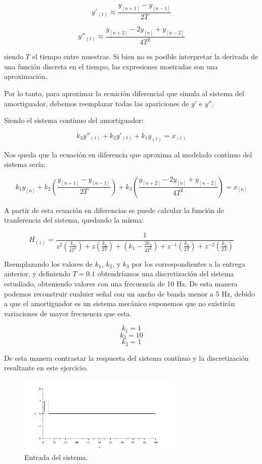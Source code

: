 \documentclass{article}
\begin{document}
$$y'_{(t)} \approx \frac{y_{[n+1]}-y_{[n-1]}}{2T}$$

$$y''_{(t)} \approx \frac{y_{[n+2]} - 2 y_{[n]} + y_{[n-2]}}{4T^2}$$

siendo $T$ el tiempo entre muestras. Si bien no es posible interpretar la derivada de una función discreta en el tiempo, las expresiones mostradas son una aproximación.


Por lo tanto, para aproximar la ecuación diferencial que simula al sistema del amortiguador, debemos reemplazar todas las apariciones de $y'$ e $y''$. 

Siendo el sistema contínuo del amortiguador:

$$k_3 y''_{(t)} + k_2 y'_{(t)} + k_1 y_{(t)} = x_{(t)}$$

Nos queda que la ecuación en diferencia que aproxima al modelado continuo del sistema sería:

$$k_1 y_{[n]} + k_2 \left(\frac{y_{[n+1]}-y_{[n-1]}}{2T}\right) + k_3 \left(\frac{y_{[n+2]} - 2 y_{[n]} + y_{[n-2]}}{4T^2}\right)= x_{[n]}$$

A partir de esta ecuación en diferencias se puede calcular la función de tranferencia del sistema, quedando la misma:

$$H_{(z)} = \frac{1}{z^2 \left(\frac{k_3}{4T^2}\right) + z \left(\frac{k_2}{2T}\right) + \left(k_1-\frac{2k_3}{4T^2}\right) + z^{-1} \left(\frac{k_2}{2T}\right) + z^{-2} \left(\frac{k_3}{2T}\right)} $$


Reemplazando los valores de $k_1$, $k_2$, y $k_3$ por los correspondientes a la entrega anterior, y definiendo $T=0.1$ obtendríamos una discretización del sistema estudiado, obteniendo valores con una frecuencia de 10 Hz. De esta manera podemos reconstruir cualuier señal con un ancho de banda menor a 5 Hz, debido a que el amortiguador es un sistema mecánico suponemos que  no existirán variaciones de mayor frecuencia que esta.

$$ k_1 =1$$
$$k_2 =10$$
$$k_3=1$$

De esta manera contrastar la respuesta del sistema contínuo y la discretización resultante en este ejercicio.

        \begin{figure}[h!]
            \centering
            \includegraphics[width=0.7\textwidth]{amortiguador_entrada.png}
            \caption{Entrada del sistema.}
            \label{entrada}
        \end{figure}
        
\end{document}
